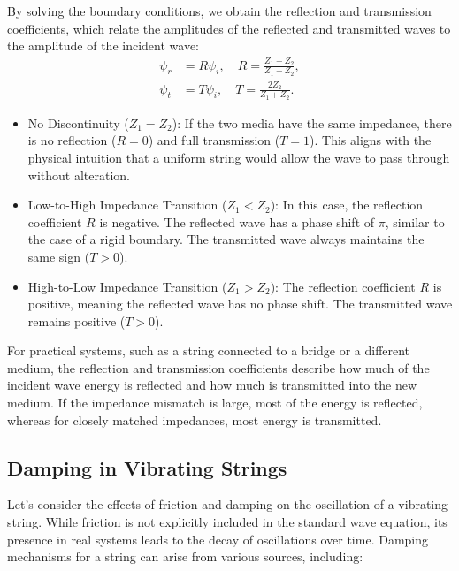 \documentclass[a4paper]{article}
\begin{document}
By solving the boundary conditions, we obtain the reflection and transmission coefficients, which relate the amplitudes of the reflected and transmitted waves to the amplitude of the incident wave:
\[
\begin{aligned}
    \psi_r &= R \psi_i, \quad R = \frac{Z_1 - Z_2}{Z_1 + Z_2}, \\
    \psi_t &= T \psi_i, \quad T = \frac{2 Z_2}{Z_1 + Z_2}.
\end{aligned}
\]
\begin{itemize}
    \item No Discontinuity (\(Z_1 = Z_2\)):
   If the two media have the same impedance, there is no reflection (\(R = 0\)) and full transmission (\(T = 1\)). This aligns with the physical intuition that a uniform string would allow the wave to pass through without alteration.

\item Low-to-High Impedance Transition (\(Z_1 < Z_2\)):
   In this case, the reflection coefficient \(R\) is negative. The reflected wave has a phase shift of \(\pi\), similar to the case of a rigid boundary. The transmitted wave always maintains the same sign (\(T > 0\)).

\item High-to-Low Impedance Transition (\(Z_1 > Z_2\)):
   The reflection coefficient \(R\) is positive, meaning the reflected wave has no phase shift. The transmitted wave remains positive (\(T > 0\)).
\end{itemize}
For practical systems, such as a string connected to a bridge or a different medium, the reflection and transmission coefficients describe how much of the incident wave energy is reflected and how much is transmitted into the new medium. If the impedance mismatch is large, most of the energy is reflected, whereas for closely matched impedances, most energy is transmitted.

\subsection{Damping in Vibrating Strings}

Let's consider the effects of friction and damping on the oscillation of a vibrating string. While friction is not explicitly included in the standard wave equation, its presence in real systems leads to the decay of oscillations over time. Damping mechanisms for a string can arise from various sources, including:
\end{document}
